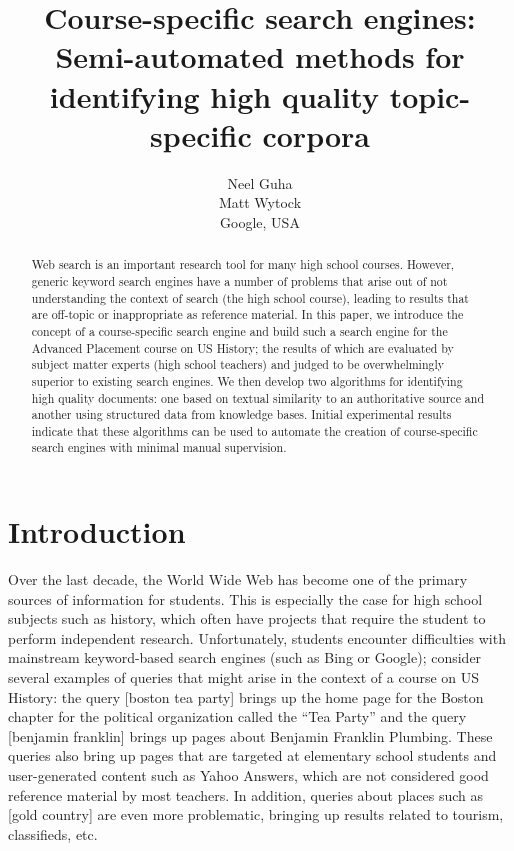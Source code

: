 \documentclass[pdfpagelabels=false,plainpages=true]{acm_proc_article-sp}
\begin{document}
\title{Course-specific search engines: Semi-automated methods for identifying
  high quality topic-specific corpora} 

\author{
  \alignauthor
  Neel Guha \\
  \alignauthor
  Matt Wytock \\
  Google, USA
}

\maketitle
\begin{abstract}
Web search is an important research tool for many high school courses. However,
generic keyword search engines have a number of problems that arise out of
not understanding the context of search (the high school course),
leading to results that are off-topic or inappropriate as reference material. In
this paper, we introduce the concept of a course-specific search 
engine and build such a search engine for the Advanced Placement course on US
History; the results of which are evaluated by subject matter experts (high
school teachers) and judged to be overwhelmingly superior to existing search engines. We
then develop two algorithms for identifying high quality documents: one 
based on textual similarity to an authoritative source and another using structured
data from knowledge bases. Initial experimental results indicate that
these algorithms can be used to automate the creation of course-specific search
engines with minimal manual supervision.
\end{abstract}

\section{Introduction}

Over the last decade, the World Wide Web has become one of the primary sources
of information for students. This is especially the case for high school
subjects such as history, which often have projects that require the student to 
perform independent research. Unfortunately, students encounter difficulties
with mainstream keyword-based search engines (such as Bing or Google); 
consider several examples of queries that might arise in the context of a course
on US History: the query [boston tea party] brings up the home page for the
Boston chapter for the political organization called the ``Tea Party'' and the
query [benjamin franklin] brings up pages about Benjamin Franklin
Plumbing. These queries also bring up pages that are targeted at elementary
school students and user-generated content such as Yahoo Answers, which are not
considered good reference material by most teachers. In addition, queries
about places such as [gold country] are even more problematic, bringing up
results related to tourism, classifieds, etc.  
\end{document}
